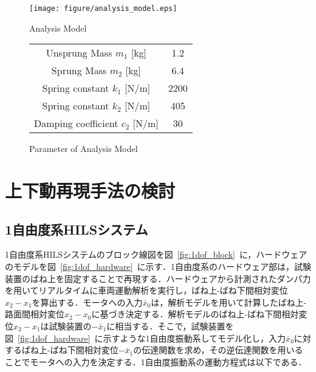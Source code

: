 \documentclass[a4paper,12pt]{article_vdlab_sotsuron}
\begin{document}
\vspace*{10mm}
\begin{figure}[htp]
  \begin{minipage}{0.5\textwidth}
    \begin{center}
      \texttt{[image: figure/analysis\_model.eps]}
      \vspace*{3mm}
      \caption{Analysis Model}
      \label{fig:analysis_model}
    \end{center}
  \end{minipage}
  \begin{minipage}{0.5\textwidth}
      \begin{center}
	\makeatletter
	\def\@captype{table}   
	\makeatother
	\caption{Parameter of Analysis Model}
	\label{tab:parameter}
	  \begin{tabular}{cc}\hline
	    Unsprung Mass $m_1$ [kg] & 1.2\\
	    Sprung Mass $m_2$ [kg] & 6.4\\
	    Spring constant $k_1$ [N/m] & 2200\\
	    Spring constant $k_2$ [N/m] & 405\\
	    Damping coefficient $c_2$ [N/m] & 30\\\hline 
	  \end{tabular}  
	\end{center}
  \end{minipage}
\end{figure}

\newpage
\section{上下動再現手法の検討}
\subsection{1自由度系HILSシステム}
1自由度系HILSシステムのブロック線図を図~\ref{fig:1dof_block}~に，ハードウェアのモデルを図~\ref{fig:1dof_hardware}~に示す．1自由度系のハードウェア部は，試験装置のばね上を固定することで再現する．ハードウェアから計測されたダンパ力を用いてリアルタイムに車両運動解析を実行し，ばね上-ばね下間相対変位$x_2-x_1$を算出する．モータへの入力$\bar x_0$は，解析モデルを用いて計算したばね上-路面間相対変位$x_2-x_0$に基づき決定する．解析モデルのばね上-ばね下間相対変位$x_2-x_1$は試験装置の$-\bar x_1$に相当する．そこで，試験装置を図~\ref{fig:1dof_hardware}~に示すような1自由度振動系してモデル化し，入力$\bar x_0$に対するばね上-ばね下間相対変位$-\bar x_1$の伝達関数を求め，その逆伝達関数を用いることでモータへの入力を決定する．1自由度振動系の運動方程式は以下である．
\end{document}
